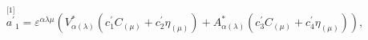\begin{equation}
\stackrel{\lbrack 1]}{a^{\prime }}_{1}=\varepsilon ^{\alpha \lambda \mu
}\left( V_{\alpha (\lambda )}^{*}\left( c_{1}^{\prime }C_{(\mu
)}+c_{2}^{\prime }\eta _{(\mu )}\right) +A_{\alpha (\lambda )}^{*}\left(
c_{3}^{\prime }C_{(\mu )}+c_{4}^{\prime }\eta _{(\mu )}\right) \right) ,
\label{bf71}
\end{equation}

